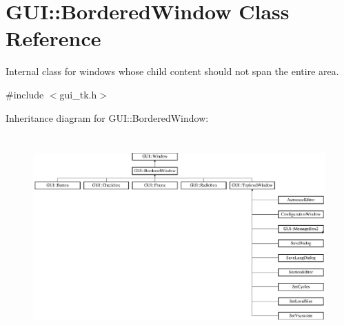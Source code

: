 \hypertarget{classGUI_1_1BorderedWindow}{\section{G\-U\-I\-:\-:Bordered\-Window Class Reference}
\label{classGUI_1_1BorderedWindow}
}


Internal class for windows whose child content should not span the entire area.  




{\ttfamily \#include $<$gui\-\_\-tk.\-h$>$}

Inheritance diagram for G\-U\-I\-:\-:Bordered\-Window\-:\begin{figure}[H]
\begin{center}
\leavevmode
\includegraphics[height=7.832168cm]{classGUI_1_1BorderedWindow}
\end{center}
\end{figure}
